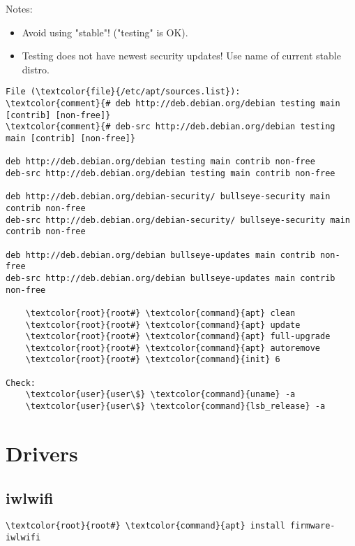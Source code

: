 \documentclass[10pt, a4paper, onecolumn, openany]{book} %
\begin{document}
Notes:
\begin{itemize}
    \item Avoid using "stable"! ("testing" is OK).
    \item Testing does not have newest security updates! Use name of current stable distro.
\end{itemize}
\begin{Verbatim}[commandchars=\\\{\}]
File (\textcolor{file}{/etc/apt/sources.list}):
\textcolor{comment}{# deb http://deb.debian.org/debian testing main [contrib] [non-free]}
\textcolor{comment}{# deb-src http://deb.debian.org/debian testing main [contrib] [non-free]}

deb http://deb.debian.org/debian testing main contrib non-free
deb-src http://deb.debian.org/debian testing main contrib non-free

deb http://deb.debian.org/debian-security/ bullseye-security main contrib non-free
deb-src http://deb.debian.org/debian-security/ bullseye-security main contrib non-free

deb http://deb.debian.org/debian bullseye-updates main contrib non-free
deb-src http://deb.debian.org/debian bullseye-updates main contrib non-free
    
    \textcolor{root}{root#} \textcolor{command}{apt} clean
    \textcolor{root}{root#} \textcolor{command}{apt} update
    \textcolor{root}{root#} \textcolor{command}{apt} full-upgrade
    \textcolor{root}{root#} \textcolor{command}{apt} autoremove
    \textcolor{root}{root#} \textcolor{command}{init} 6

Check:
    \textcolor{user}{user\$} \textcolor{command}{uname} -a 
    \textcolor{user}{user\$} \textcolor{command}{lsb_release} -a 
\end{Verbatim}


\section{Drivers}
\subsection{iwlwifi}
\begin{Verbatim}[commandchars=\\\{\}]
    \textcolor{root}{root#} \textcolor{command}{apt} install firmware-iwlwifi
\end{Verbatim}
\end{document}
